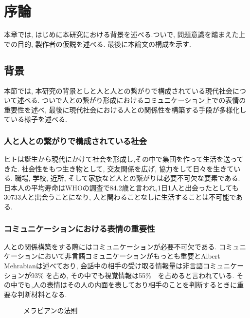 \chapter{序論}
\label{chap:introduction}

本章では, はじめに本研究における背景を述べる.ついで, 問題意識を踏まえた上での目的, 製作者の仮説を述べる. 最後に本論文の構成を示す.

\section{背景}
本節では, 本研究の背景としと人と人との繋がりで構成されている現代社会について述べる. ついで人との繋がり形成におけるコミュニケーション上での表情の重要性を述べ, 最後に現代社会における人との関係性を構築する手段が多様化している様子を述べる.


\subsection{人と人との繋がりで構成されている社会}
ヒトは誕生から現代にかけて社会を形成し,その中で集団を作って生活を送ってきた. 社会性をもつ生き物として, 交友関係を広げ, 協力をして日々を生きている. 職場, 学校, 近所, そして家族など人との繋がりは必要不可欠な要素である. 日本人の平均寿命はWHOの調査で84.2歳\cite{WHO_reserch}と言われ,1日1人と出会ったとしても30733人と出会うことになり, 人と関わることなしに生活することは不可能である.
\subsection{コミュニケーションにおける表情の重要性}
人との関係構築をする際にはコミュニケーションが必要不可欠である. コミュニケーションにおいて非言語コミュニケーションがもっとも重要とAlbert Mehrabian\cite{rule_of_Mehrabian}は述べており, 会話中の相手の受け取る情報量は非言語コミュニケーションが93\% を占め, その中でも視覚情報は55\%　を占めると言われている. その中でも,人の表情はその人の内面を表しており相手のことを判断するときに重要な判断材料となる.
\begin{figure}[htbp]
    \begin{center}
    \end{center}
    \caption{メラビアンの法則}
    \label{fig:mehrabian}
\end{figure}


